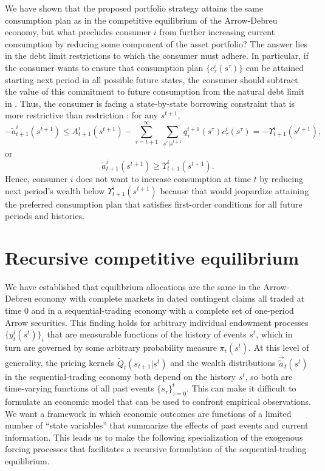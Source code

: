We have shown that the proposed portfolio strategy attains the same
consumption plan
as in the competitive equilibrium of the Arrow-Debreu economy, but what
precludes consumer $i$ from further increasing current consumption by
reducing some component of the asset portfolio? The answer lies
in the debt limit restrictions to which the consumer must adhere. In
particular,
if the consumer wants to ensure that consumption plan
$\{c^i_\tau(s^\tau)\}$
can be attained starting next period in all possible future states,
the consumer should subtract the value of this commitment to future
consumption
from the natural debt limit in .
 Thus, the consumer is facing a
state-by-state borrowing constraint that is more
 restrictive than restriction :
for any $s^{t+1}$,
$$  -  \tilde a^i_{t+1}(s^{t+1}) \leq  A^i_{t+1}(s^{t+1} )
- \sum_{\tau=t+1}^\infty \; \sum_{s^\tau \vert s^{t+1}}
  q_\tau^{t+1}(s^\tau) c^i_\tau(s^\tau)
  = - \Upsilon^i_{t+1}(s^{t+1}),$$
or
$$   \tilde a^i_{t+1}(s^{t+1})  \geq  \Upsilon^i_{t+1}(s^{t+1}). $$
Hence, consumer $i$ does not want to increase consumption at time $t$ by
reducing next period's wealth below $\Upsilon^i_{t+1}(s^{t+1})$ because
that would jeopardize attaining the preferred consumption plan
that satisfies first-order conditions  for all future periods and
histories.








\section{Recursive competitive equilibrium}\label{sec:Markovs}%
We have established that  equilibrium allocations are the same
in the Arrow-Debreu economy with  complete markets in dated
contingent claims all traded at time 0 and in a sequential-trading
economy with a complete set of one-period Arrow securities. This finding
holds for arbitrary individual endowment processes
$\{y^i_t(s^t)\}_i$ that are measurable functions of the history of
events $s^t$, which in turn are governed by some arbitrary
probability measure $\pi_t(s^t)$. At this level of generality,
 the pricing kernels $\tilde Q_t(s_{t+1} | s^t)$ and the
wealth distributions $\vec {\tilde a}_t(s^t)$ in the
sequential-trading economy both depend on the history $s^t$, so both
 are time-varying functions of all past events
$\{s_\tau\}_{\tau=0}^t$. This can make it  difficult to
formulate an economic model that can be used to confront empirical
observations. We want  a framework in which economic outcomes
are functions of a limited number of ``state variables'' that
summarize the effects of past events and current information. This
 leads us to make the following specialization of the
exogenous forcing processes that facilitates a recursive formulation
of the sequential-trading equilibrium.


